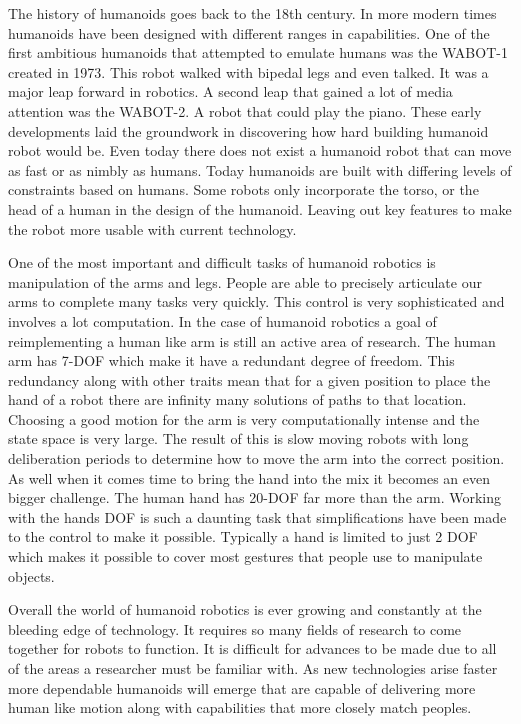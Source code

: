 \documentclass{article}
\begin{document}
The history of humanoids goes back to the 18th century. In more modern times humanoids have been designed with different ranges in capabilities. One of the first ambitious humanoids that attempted to emulate humans was the WABOT-1 created in 1973. This robot walked with bipedal legs and even talked. It was a major leap forward in robotics. A second leap that gained a lot of media attention was the WABOT-2. A robot that could play the piano. These early developments laid the groundwork in discovering how hard building humanoid robot would be. Even today there does not exist a humanoid robot that can move as fast or as nimbly as humans. Today humanoids are built with differing levels of constraints based on humans. Some robots only incorporate the torso, or the head of a human in the design of the humanoid. Leaving out key features to make the robot more usable with current technology.

One of the most important and difficult tasks of humanoid robotics is manipulation of the arms and legs. People are able to precisely articulate our arms to complete many tasks very quickly. This control is very sophisticated and involves a lot computation. In the case of humanoid robotics a goal of reimplementing a human like arm is still an active area of research. The human arm has 7-DOF which make it have a redundant degree of freedom. This redundancy along with other traits mean that for a given position to place the hand of a robot there are infinity many solutions of paths to that location. Choosing a good motion for the arm is very computationally intense and the state space is very large. The result of this is slow moving robots with long deliberation periods to determine how to move the arm into the correct position. As well when it comes time to bring the hand into the mix it becomes an even bigger challenge. The human hand has 20-DOF far more than the arm. Working with the hands DOF is such a daunting task that simplifications have been made to the control to make it possible. Typically a hand is limited to just 2 DOF which makes it possible to cover most gestures that people use to manipulate objects.

Overall the world of humanoid robotics is ever growing and constantly at the bleeding edge of technology. It requires so many fields of research to come together for robots to function. It is difficult for advances to be made due to all of the areas a researcher must be familiar with. As new technologies arise faster more dependable humanoids will emerge that are capable of delivering more human like motion along with capabilities that more closely match peoples.
\end{document}

